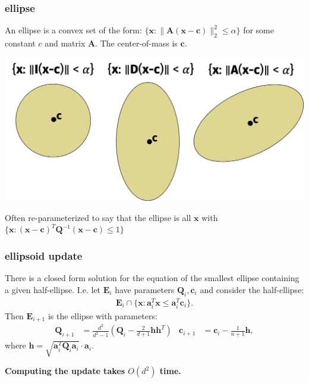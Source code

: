 \documentclass[compress]{beamer}
\newcommand{\bv}[1]{\mathbf{#1}}
\begin{document}
\begin{frame}
		\frametitle{ellipse}
		An ellipse is a convex set of the form: $\{\bv{x}: \|\bv{A}(\bv{x} - \bv{c})\|_2^2 \leq \alpha\}$ for some constant $c$ and matrix $\bv{A}$. The center-of-mass is  $\bv{c}$. 
		\begin{center}
			\includegraphics[width=\textwidth]{ellipses.png}
		\end{center}
	
	Often re-parameterized to say that the ellipse is all $\bv{x}$ with $\{\bv{x}: (\bv{x} - \bv{c})^T\bv{Q}^{-1}(\bv{x} - \bv{c})\leq 1\}$
\end{frame}

\begin{frame}
	\frametitle{ellipsoid update}
	There is a closed form solution for the equation of the smallest ellipse containing a given half-ellipse. I.e. let $\bv{E}_i$ have parameters $\bv{Q}_i,\bv{c}_i$ and consider the half-ellipse:
	\begin{align*}
		\bv{E}_i \cap \{\bv{x}: \bv{a}_i^T\bv{x} \leq \bv{a}_i^T\bv{c}_i\}. 
	\end{align*}
Then $\bv{E}_{i+1}$ is the ellipse with parameters:
\begin{align*}
	\bv{Q}_{i+1} &= \frac{d^2}{d^2 - 1}\left(\bv{Q}_{i} - \frac{2}{d+1} \bv{h}\bv{h}^T \right) & \bv{c}_{i+1}& = \bv{c}_{i} - \frac{1}{n+1}\bv{h},
\end{align*}
where $\bv{h} = \sqrt{\bv{a}_i^T\bv{Q}_i\bv{a}_i}\cdot \bv{a}_i$.

\textbf{\alert{Computing the update takes $O(d^2)$ time.}}
	
\end{frame}
\end{document}
